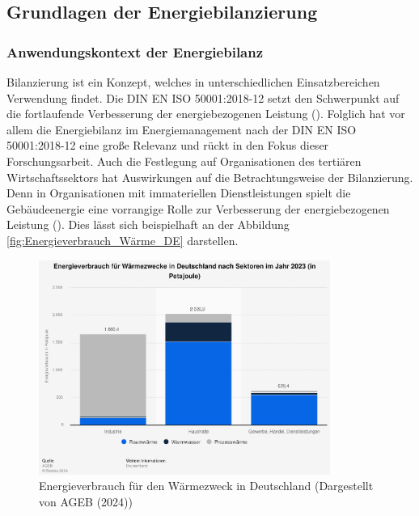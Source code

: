 \subsection{Grundlagen der Energiebilanzierung}

\subsubsection{Anwendungskontext der Energiebilanz}

Bilanzierung ist ein Konzept, welches in unterschiedlichen Einsatzbereichen Verwendung findet. 
Die DIN EN ISO 50001:2018-12 setzt den Schwerpunkt auf die fortlaufende Verbesserung der energiebezogenen Leistung (\cite[Kapitel 0.2]{DIN50001.2018}). 
Folglich hat vor allem die Energiebilanz im Energiemanagement nach der DIN EN ISO 50001:2018-12 eine große Relevanz und rückt in den Fokus 
dieser Forschungsarbeit.
Auch die Festlegung auf Organisationen des tertiären Wirtschaftssektors hat Auswirkungen auf die Betrachtungsweise der Bilanzierung. Denn in Organisationen 
mit immateriellen Dienstleistungen spielt die Gebäudeenergie eine vorrangige Rolle zur Verbesserung der energiebezogenen Leistung (\cite[S. 3]{Fichera.2020}).
Dies lässt sich beispielhaft an der Abbildung \eqref{fig:Energieverbrauch_Wärme_DE} darstellen.

\begin{figure}[H]
    \centering
    \includegraphics[width=0.85\textwidth]{../../Ressourcen/Abbildungen/Energieverbrauch_für_Wärmezweck_DE.jpg}
    \caption{Energieverbrauch für den Wärmezweck in Deutschland (Dargestellt von AGEB (2024))}
    \label{fig:Energieverbrauch_Wärme_DE}
\end{figure}

